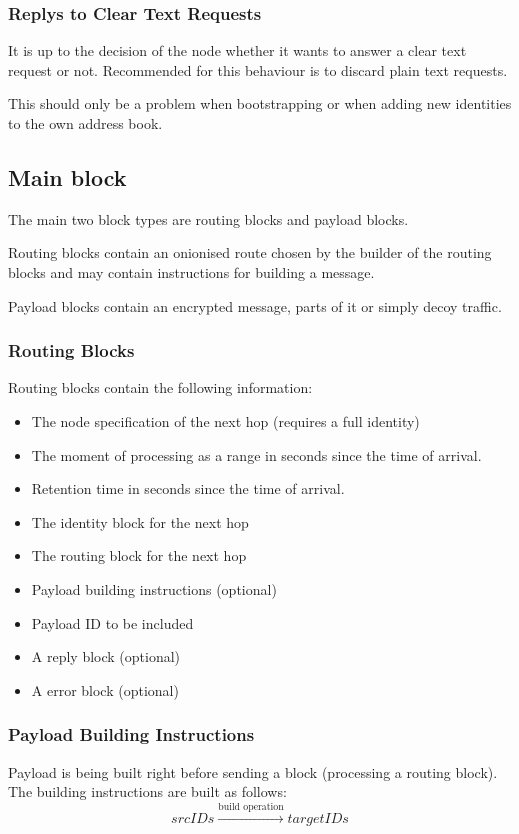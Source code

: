 
\subsubsection{Replys to Clear Text Requests}
It is up to the decision of the node whether it wants to answer a clear text request or not. Recommended for this behaviour is to discard plain text requests. 

This should only be a problem when bootstrapping or when adding new identities to the own address book. 

\subsection{Main block}
The main two block types are routing blocks and payload blocks. 

Routing blocks contain an onionised route chosen by the builder of the routing blocks and may contain instructions for building a message.

Payload blocks contain an encrypted message, parts of it or simply decoy traffic.

\subsubsection{Routing Blocks}
Routing blocks contain the following information:
\begin{itemize}
	\item The node specification of the next hop (requires a full identity)
	\item The moment of processing as a range in seconds since the time of arrival.
	\item Retention time in seconds since the time of arrival.
	\item The identity block for the next hop
	\item The routing block for the next hop
	\item Payload building instructions (optional)
	\item Payload ID to be included
	\item A reply block (optional)
	\item A error block (optional)
\end{itemize}

\subsubsection{Payload Building Instructions}
Payload is being built right before sending a block (processing a routing block). The building instructions are built as follows:
\begin{equation*}
srcIDs \xrightarrow{\text{build operation}} targetIDs
\end{equation*}

